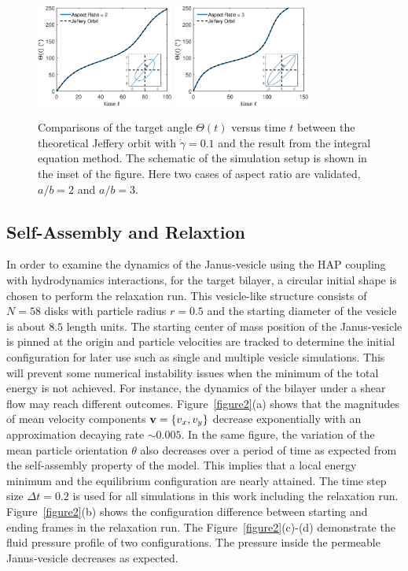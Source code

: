 \documentclass[lineno]{jfm}
\begin{document}
\begin{figure}
\centering
\includegraphics[width=0.4\textwidth]{JefferyOrbit2.eps}
\includegraphics[width=0.4\textwidth]{JefferyOrbit3.eps}
  \caption{Comparisons of the target angle $\Theta(t)$ versus time $t$ between the theoretical Jeffery orbit with $\dot\gamma=0.1$ and the result from the integral equation method. The schematic of the simulation setup is shown in the inset of the figure. Here two cases of aspect ratio are validated, $a/b = 2$ and $a/b=3$.
  }
    \label{figure1}
\end{figure}

\subsection{Self-Assembly and Relaxtion}

In order to examine the dynamics of the Janus-vesicle using the HAP coupling with hydrodynamics interactions, for the target bilayer, a circular initial shape is chosen to perform the relaxation run. 
This vesicle-like structure consists of $N=58$ disks with particle radius $r=0.5$ and the starting diameter of 
the vesicle is about $8.5$ length units.
The starting center of mass position of the Janus-vesicle is pinned at the origin and particle velocities are tracked to determine the initial configuration for later use such as single and multiple vesicle simulations. 
This will prevent some numerical instability issues when the minimum of the total energy is not achieved. 
For instance, the dynamics of the bilayer under a shear flow may reach different outcomes.
Figure~\ref{figure2}(a) shows that the magnitudes of mean velocity components ${\bf v}=\{v_x,v_y\}$ decrease exponentially with an approximation decaying rate $\sim0.005$. In the same figure, the variation of the mean particle orientation $\theta$ also decreases over a period of time as expected from the self-assembly property of the model. This implies that a local energy minimum and the equilibrium configuration are 
nearly attained. 
The time step size $\Delta t=0.2$ is used for all simulations in this work including the relaxation run.
Figure~\ref{figure2}(b) shows the configuration difference between starting and ending frames in the relaxation run. The Figure~\ref{figure2}(c)-(d) demonstrate the fluid pressure profile of two configurations. The pressure inside the permeable Janus-vesicle decreases as expected.
\end{document}

